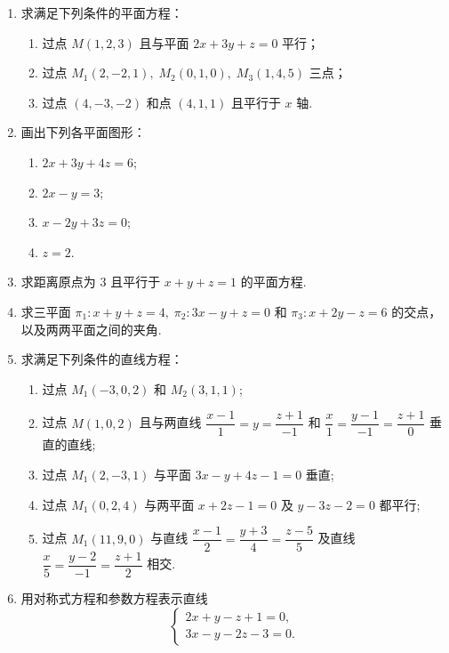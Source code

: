 \begin{enumerate}\setlength{\itemsep}{7pt}
    \item 求满足下列条件的平面方程：
    \begin{enumerate}[(1)]\setlength{\itemsep}{5pt}\setlength{\topsep}{15pt}
        \item 过点 $M(1, 2, 3)$ 且与平面 $2x+3y+z=0$ 平行；
        \item 过点 $M_1(2, -2, 1),\;M_2(0, 1, 0),\;M_3(1, 4, 5)$ 三点；
        \item 过点 $(4, -3, -2)$ 和点 $(4, 1, 1)$ 且平行于 $x$ 轴.
    \end{enumerate}

    \item 画出下列各平面图形：
    \begin{enumerate}[(1)]\setlength{\itemsep}{5pt}\setlength{\topsep}{15pt}
        \item $2x+3y+4z=6$;
        \item $2x-y=3$;
        \item $x-2y+3z=0$;
        \item $z=2$.
    \end{enumerate}

    \item 求距离原点为 $3$ 且平行于 $x+y+z=1$ 的平面方程.
    
    \item 求三平面 $\pi_1 : x+y+z=4,\;\pi_2 : 3x-y+z=0$ 和 $\pi_3 : x+2y-z=6$ 的交点，以及两两平面之间的夹角.
    
    \item 求满足下列条件的直线方程：
    \begin{enumerate}[(1)]\setlength{\itemsep}{5pt}\setlength{\topsep}{15pt}
        \item 过点 $M_1(-3, 0, 2)$ 和 $M_2(3, 1, 1)$;
        \item 过点 $M(1, 0, 2)$ 且与两直线 $\dfrac{x-1}{1}=y=\dfrac{z+1}{-1}$ 和 $\dfrac{x}{1}=\dfrac{y-1}{-1}=\dfrac{z+1}{0}$ 垂直的直线;
        \item 过点 $M_1(2, -3, 1)$ 与平面 $3x-y+4z-1=0$ 垂直;
        \item 过点 $M_1(0, 2, 4)$ 与两平面 $x+2z-1=0$ 及 $y-3z-2=0$ 都平行;
        \item 过点 $M_1(11, 9, 0)$ 与直线 $\dfrac{x-1}{2}=\dfrac{y+3}{4}=\dfrac{z-5}{5}$ 及直线 $\dfrac{x}{5}=\dfrac{y-2}{-1}=\dfrac{z+1}{2}$ 相交.
    \end{enumerate}

    \item 用对称式方程和参数方程表示直线
    \[
        \begin{cases}
            2x+y-z+1=0,\\
            3x-y-2z-3=0.
        \end{cases}
    \]


\end{enumerate}
